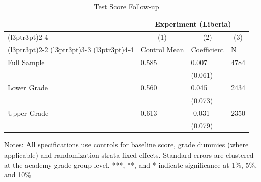 \begin{table}[!h]
\centering
\caption{Test Score Follow-up}
\centering
\begin{threeparttable}
\begin{tabular}[t]{llll}
\toprule
\multicolumn{1}{c}{ } & \multicolumn{3}{c}{Experiment (Liberia)} \\
\cmidrule(l{3pt}r{3pt}){2-4}
\multicolumn{1}{c}{ } & \multicolumn{1}{c}{(1)} & \multicolumn{1}{c}{(2)} & \multicolumn{1}{c}{(3)} \\
\cmidrule(l{3pt}r{3pt}){2-2} \cmidrule(l{3pt}r{3pt}){3-3} \cmidrule(l{3pt}r{3pt}){4-4}
 & Control Mean & Coefficient & N\\
\midrule
Full Sample & 0.585 & 0.007 & 4784\\
 &  & (0.061) & \\
Lower Grade & 0.560 & 0.045 & 2434\\
 &  & (0.073) & \\
Upper Grade & 0.613 & -0.031 & 2350\\
 &  & (0.079) & \\
\bottomrule
\end{tabular}
\begin{tablenotes}[para]
\item Notes: All specifications use controls for baseline score, grade dummies (where applicable) and randomization strata fixed effects. Standard errors are clustered at the academy-grade group level. ***, **, and * indicate significance at 1\%, 5\%, and 10\%
\end{tablenotes}
\end{threeparttable}
\end{table}
